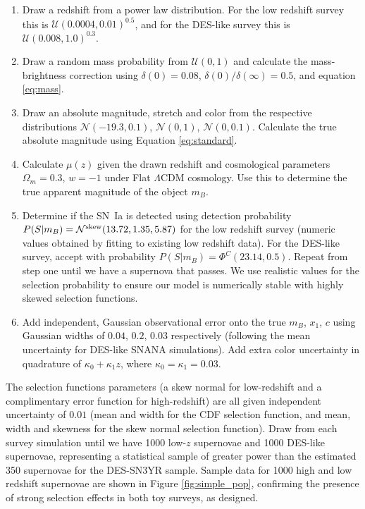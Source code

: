\documentclass[a4paper,fleqn,usenatbib,manuscript]{emulateapj}
\begin{document}
\begin{enumerate}[1.]
	\item Draw a redshift from a power law distribution. For the low redshift survey this is $\mathcal{U}(0.0004, 0.01)^{0.5}$, and for the DES-like survey this is $\mathcal{U}(0.008, 1.0)^{0.3}$.
	\item Draw a random mass probability from $\mathcal{U}(0, 1)$ and calculate the mass-brightness correction using $\delta(0) = 0.08$, $\delta(0)/\delta(\infty) = 0.5$, and equation \eqref{eq:mass}.
	\item Draw an absolute magnitude, stretch and color from the respective distributions $\mathcal{N}(-19.3, 0.1)$, $\mathcal{N}(0, 1)$, $\mathcal{N}(0, 0.1)$. Calculate the true absolute magnitude using Equation \eqref{eq:standard}.
	\item Calculate $\mu(z)$ given the drawn redshift and cosmological parameters $\Omega_m = 0.3$, $w = -1$ under Flat $\Lambda$CDM cosmology. Use this to determine the true apparent magnitude of the object $m_B$.
	\item Determine if the SN~Ia is detected using detection probability $P(S|m_B) = \mathcal{N}^{\rm skew}(13.72, 1.35, 5.87)$ for the low redshift survey (numeric values obtained by fitting to existing low redshift data). For the DES-like survey, accept with probability $P(S|m_B) = \Phi^C(23.14, 0.5)$. Repeat from step one until we have a supernova that passes. We use realistic values for the selection probability to ensure our model is numerically stable with highly skewed selection functions.
	\item Add independent, Gaussian observational error onto the true $m_B$, $x_1$, $c$ using Gaussian widths of $0.04$, $0.2$, $0.03$ respectively (following the mean uncertainty for DES-like SNANA simulations). Add extra color uncertainty in quadrature of $\kappa_0 + \kappa_1 z$, where $\kappa_0 = \kappa_1 = 0.03$.
\end{enumerate}

The selection functions parameters (a skew normal for low-redshift and a complimentary error function for high-redshift) are all given independent uncertainty of $0.01$ (mean and width for the CDF selection function, and mean, width and skewness for the skew normal selection function). Draw from each survey simulation until we have 1000 low-$z$ supernovae and 1000 DES-like supernovae, representing a statistical sample of greater power than the estimated 350 supernovae for the DES-SN3YR sample. Sample data for 1000 high and low redshift supernovae are shown in Figure \ref{fig:simple_pop}, confirming the presence of strong selection effects in both toy surveys, as designed. 
\end{document}
